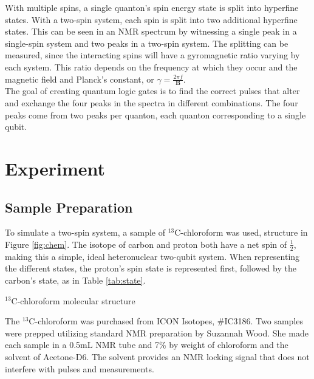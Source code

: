\documentclass[11pt]{article}
\newcommand{\super}[1]{\ensuremath{^{\textrm{#1}}}}
\begin{document}
\begin{multicols}{2}
With multiple spins, a single quanton's spin energy state is split into hyperfine states.\cite{nmr-roberts} With a two-spin system, each spin is split into two additional hyperfine states. This can be seen in an NMR spectrum by witnessing a single peak in a single-spin system and two peaks in a two-spin system. The splitting can be measured, since the interacting spins will have a gyromagnetic ratio varying by each system. This ratio depends on the frequency at which they occur and the magnetic field and Planck's constant, or $\gamma = \frac{2 \pi f}{\textbf{B}}$. \\

The goal of creating quantum logic gates is to find the correct pulses that alter and exchange the four peaks in the spectra in different combinations. The four peaks come from two peaks per quanton, each quanton corresponding to a single qubit.\cite{gates}

\section{\textbf{Experiment}}
  \subsection{Sample Preparation}
  To simulate a two-spin system, a sample of \super{13}C-chloroform was used, structure in Figure \ref{fig:chem}. The isotope of carbon and proton both have a net spin of $\frac{1}{2}$, making this a simple, ideal heteronuclear two-qubit system.\cite{mit-lab,lnmr} When representing the different states, the proton's spin state is represented first, followed by the carbon's state, as in Table \ref{tab:state}.

\begin{cfigure}
  \begin{center}
  \end{center}
  \caption{\super{13}C-chloroform molecular structure}
  \label{fig:chem}
\end{cfigure}
\vspace{1em}

The \super{13}C-chloroform was purchased from ICON Isotopes, \#IC3186. Two samples were prepped utilizing standard NMR preparation by Suzannah Wood. She made each sample in a 0.5mL NMR tube and 7\% by weight of chloroform and the solvent of Acetone-D6. The solvent provides an NMR locking signal that does not interfere with pulses and measurements.\cite{mit-lab} \\


\end{multicols}
\end{document}
